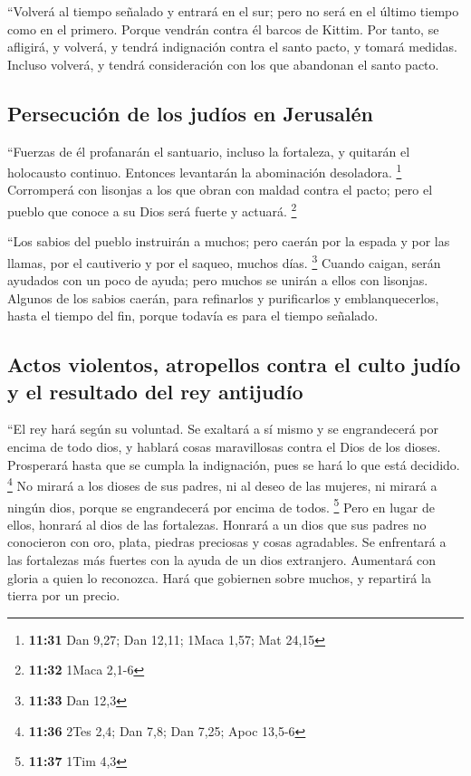  ``Volverá al tiempo señalado y entrará en el sur; pero
no será en el último tiempo como en el primero.  Porque
vendrán contra él barcos de Kittim. Por tanto, se afligirá, y volverá, y
tendrá indignación contra el santo pacto, y tomará medidas. Incluso
volverá, y tendrá consideración con los que abandonan el santo pacto.

\hypertarget{persecuciuxf3n-de-los-juduxedos-en-jerusaluxe9n}{%
\subsection{Persecución de los judíos en
Jerusalén}\label{persecuciuxf3n-de-los-juduxedos-en-jerusaluxe9n}}

 ``Fuerzas de él profanarán el santuario, incluso la
fortaleza, y quitarán el holocausto continuo. Entonces levantarán la
abominación desoladora. \footnote{\textbf{11:31} Dan 9,27; Dan 12,11;
  1Maca 1,57; Mat 24,15}  Corromperá con lisonjas a los
que obran con maldad contra el pacto; pero el pueblo que conoce a su
Dios será fuerte y actuará. \footnote{\textbf{11:32} 1Maca 2,1-6}

 ``Los sabios del pueblo instruirán a muchos; pero caerán
por la espada y por las llamas, por el cautiverio y por el saqueo,
muchos días. \footnote{\textbf{11:33} Dan 12,3}  Cuando
caigan, serán ayudados con un poco de ayuda; pero muchos se unirán a
ellos con lisonjas.  Algunos de los sabios caerán, para
refinarlos y purificarlos y emblanquecerlos, hasta el tiempo del fin,
porque todavía es para el tiempo señalado.

\hypertarget{actos-violentos-atropellos-contra-el-culto-juduxedo-y-el-resultado-del-rey-antijuduxedo}{%
\subsection{Actos violentos, atropellos contra el culto judío y el
resultado del rey
antijudío}\label{actos-violentos-atropellos-contra-el-culto-juduxedo-y-el-resultado-del-rey-antijuduxedo}}

 ``El rey hará según su voluntad. Se exaltará a sí mismo
y se engrandecerá por encima de todo dios, y hablará cosas maravillosas
contra el Dios de los dioses. Prosperará hasta que se cumpla la
indignación, pues se hará lo que está decidido. \footnote{\textbf{11:36}
  2Tes 2,4; Dan 7,8; Dan 7,25; Apoc 13,5-6}  No mirará a
los dioses de sus padres, ni al deseo de las mujeres, ni mirará a ningún
dios, porque se engrandecerá por encima de todos. \footnote{\textbf{11:37}
  1Tim 4,3}  Pero en lugar de ellos, honrará al dios de
las fortalezas. Honrará a un dios que sus padres no conocieron con oro,
plata, piedras preciosas y cosas agradables.  Se
enfrentará a las fortalezas más fuertes con la ayuda de un dios
extranjero. Aumentará con gloria a quien lo reconozca. Hará que
gobiernen sobre muchos, y repartirá la tierra por un precio.


